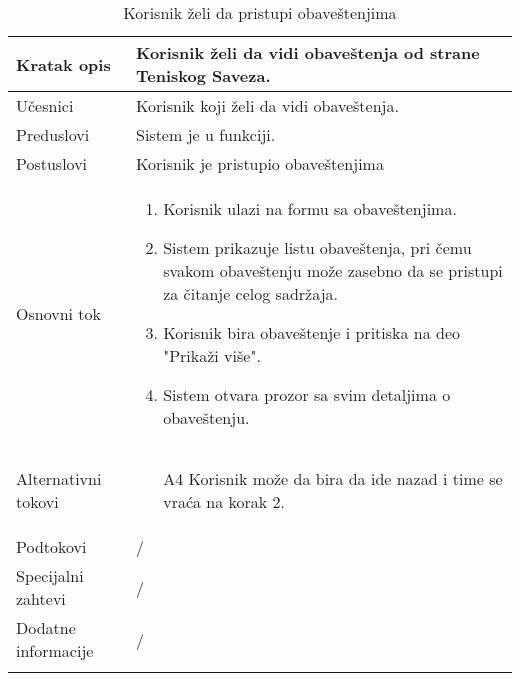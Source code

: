 \documentclass{article}
\begin{document}
        \begin{longtable}{| p{} | p{} |} 
            \hline
                Kratak opis & Korisnik želi da vidi obaveštenja od strane Teniskog Saveza.\\ 
            \hline    
                Učesnici & Korisnik koji želi da vidi obaveštenja. \\
            \hline
               Preduslovi &  Sistem je u funkciji.\\
            \hline  
                Postuslovi &  Korisnik je pristupio obaveštenjima\\
            \hline
                Osnovni tok & \begin{enumerate}
                    \item Korisnik ulazi na formu sa obaveštenjima.
                    \item Sistem prikazuje listu obaveštenja, pri čemu svakom obaveštenju može zasebno da se pristupi za čitanje celog sadržaja.
                    \item Korisnik bira obaveštenje i pritiska na deo "Prikaži više".
                    \item Sistem otvara prozor sa svim detaljima o obaveštenju.
                \end{enumerate}\\
            \hline
                Alternativni tokovi & \begin{itemize}
                    \item[A4] Korisnik može da bira da ide nazad i time se vraća na korak 2.
                \end{itemize}\\
            \hline
                Podtokovi & /\\
            \hline
                Specijalni zahtevi & /\\
            \hline
                Dodatne informacije & /\\
            \hline
            \caption{Korisnik želi da pristupi obaveštenjima} 
        \end{longtable}
\end{document}
